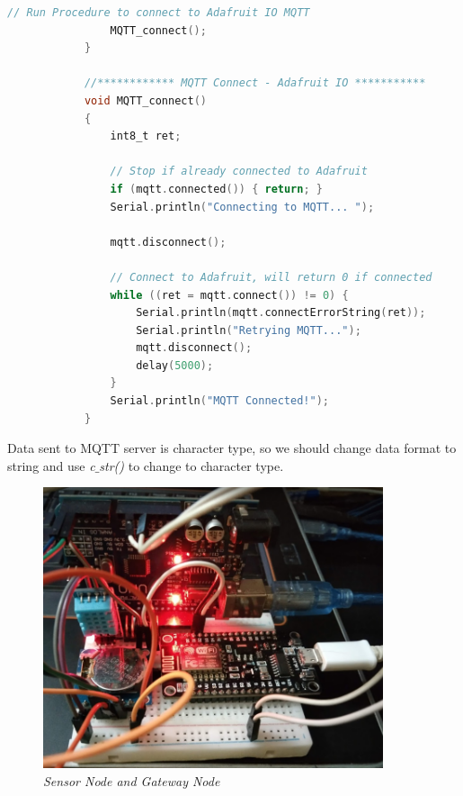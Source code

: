 \documentclass[13pt,a4paper]{article}
\begin{document}
\begin{lstlisting}[language=C, caption= MQTT sending data, label=test_float]
	 			// Run Procedure to connect to Adafruit IO MQTT                        
	 			MQTT_connect();                               
	 		}
	 		
	 		//************ MQTT Connect - Adafruit IO ***********
	 		void MQTT_connect() 
	 		{
	 			int8_t ret;
	 			
	 			// Stop if already connected to Adafruit
	 			if (mqtt.connected()) { return; }                       
	 			Serial.println("Connecting to MQTT... ");
	 			
	 			mqtt.disconnect();
	 			
	 			// Connect to Adafruit, will return 0 if connected
	 			while ((ret = mqtt.connect()) != 0) {                   
	 				Serial.println(mqtt.connectErrorString(ret));
	 				Serial.println("Retrying MQTT...");
	 				mqtt.disconnect();
	 				delay(5000);                                       // wait 5 seconds
	 			}
	 			Serial.println("MQTT Connected!");  
	 		}
		 \end{lstlisting}
		 Data sent to MQTT server is character type, so we should change data format to string and use \textit{c$\_$str()} to change to character type.
		\begin{figure}[h!]
			\begin{center}
				\includegraphics[width=10cm]{node.png}
				\caption{\textit{Sensor Node and Gateway Node}}
			\end{center}
		\end{figure}
\end{document}
